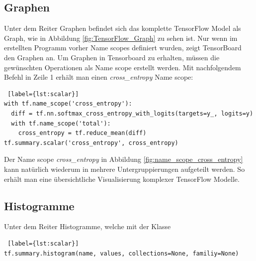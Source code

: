 \subsection{Graphen} \label{sub:tb-graph}
\vspace{10pt}
Unter dem Reiter Graphen befindet sich das komplette TensorFlow Model als Graph,  wie in Abbildung \ref{fig:TensorFlow_Graph} zu sehen ist. Nur wenn im erstellten Programm vorher Name scopes definiert wurden, zeigt TensorBoard den Graphen an. Um Graphen in Tensorboard zu erhalten, müssen die gewünschten Operationen als Name scope erstellt werden. Mit nachfolgendem Befehl in Zeile 1 erhält man einen \textit{cross\_entropy} Name scope: 
\\

\begin{minipage}{\linewidth}
\begin{lstlisting} [label={lst:scalar}]
with tf.name_scope('cross_entropy'):
  diff = tf.nn.softmax_cross_entropy_with_logits(targets=y_, logits=y)
  with tf.name_scope('total'):
    cross_entropy = tf.reduce_mean(diff)
tf.summary.scalar('cross_entropy', cross_entropy)
\end{lstlisting}
\end{minipage}
\vspace{0.2cm}

Der Name scope \textit{cross\_entropy} in Abbildung \ref{fig:name_scope_cross_entropy} kann natürlich wiederum in mehrere Untergruppierungen aufgeteilt werden. So erhält man eine übersichtliche Visualisierung komplexer TensorFlow Modelle. \cite{tensorboard.2017}






\subsection{Histogramme}
\vspace{10pt}
Unter dem Reiter Histogramme, welche mit der Klasse
\\

\begin{minipage}{\linewidth}
\begin{lstlisting} [label={lst:scalar}]
tf.summary.histogram(name, values, collections=None, familiy=None)
\end{lstlisting}
\end{minipage}
\vspace{0.2cm}


